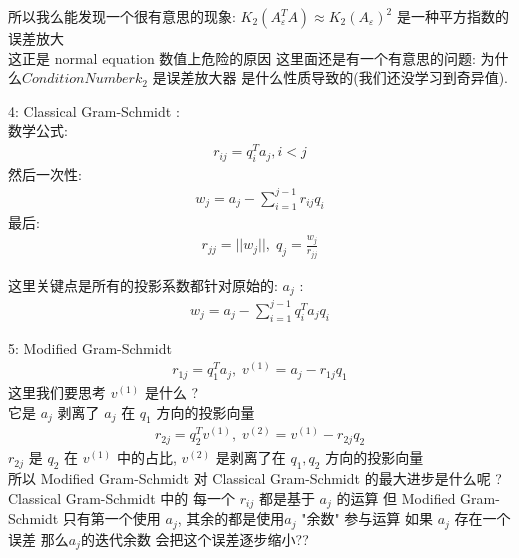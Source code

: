 \documentclass[12pt]{article}
\begin{document}
\begin{flushleft}
    所以我么能发现一个很有意思的现象:  $ K_{2}(A_{\varepsilon}^{T}A) ≈ K_{2}(A_{\varepsilon})^{2}$ 是一种平方指数的误差放大 \\
    这正是 normal equation 数值上危险的原因
    这里面还是有一个有意思的问题: 为什么$Condition Number k_{2}$ 是误差放大器 是什么性质导致的(我们还没学习到奇异值).

    4: Classical Gram-Schmidt : \\
    数学公式: \\
    \begin{align}
        r_{ij} = q_{i}^{T}a_{j}, i  <  j
    \end{align}
    然后一次性: \\
    \begin{align}
        w_{j} = a_{j}-  \sum_{i = 1}^{j - 1} r_{ij}q_{i}
    \end{align}
    最后: \\
    \begin{align}
        r_{jj} =  ||w_{j}||,\;  q_{j} = \frac{w_{j}}{r_{jj}}
    \end{align}

    这里关键点是所有的投影系数都针对原始的: $a_{j}$ : \\
    \begin{align}
        w_{j} = a_{j} - \sum_{i = 1}^{j -1} q_{i}^{T}a_{j}q_{i}
    \end{align}

    5: Modified Gram-Schmidt \\
    \begin{align}
        r_{1j} = q_{1}^{T}a_{j}, \; v^{(1)} = a_{j} - r_{1j}q_{1}
    \end{align}
    这里我们要思考 $v^{(1)}$ 是什么 ? \\
    它是 $a_{j}$ 剥离了 $a_{j}$ 在 $q_{1}$ 方向的投影向量 \\
    \begin{align}
        r_{2j} = q_{2}^{T}v^{(1)}, \; v^{(2)} = v^{(1)} - r_{2j}q_{2}
    \end{align}
    $r_{2j}$ 是 $q_{2}$ 在 $v^{(1)}$ 中的占比, \; $v^{(2)}$ 是剥离了在 $q_{1}, q_{2}$ 方向的投影向量 \\
    所以 Modified Gram-Schmidt 对 Classical Gram-Schmidt 的最大进步是什么呢 ? \\
    Classical Gram-Schmidt 中的 每一个 $r_{ij}$ 都是基于 $a_{j}$ 的运算
    但  Modified Gram-Schmidt 只有第一个使用 $a_{j}$, 其余的都是使用$a_{j}$ "余数" 参与运算
    如果 $a_{j}$ 存在一个误差 那么$a_{j}$的迭代余数 会把这个误差逐步缩小??


\end{flushleft}
\end{document}
